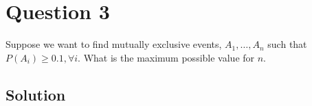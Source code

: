 \section*{Question 3}

Suppose we want to find mutually exclusive events, \( A_1, \dots, A_n \) such that \( P(A_i) \geq 0.1, \forall i \).
What is the maximum possible value for \( n \).

\subsection*{Solution}
